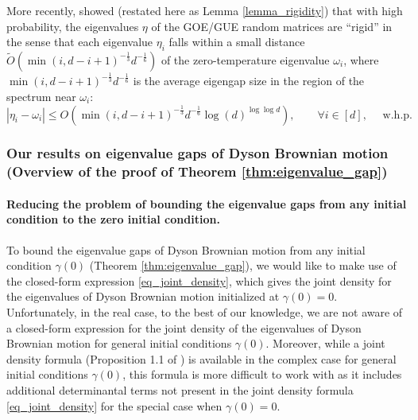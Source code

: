 \documentclass[11pt,letterpaper]{article}
\begin{document}
More recently, \cite{erdHos2012rigidity} showed (restated here as Lemma \ref{lemma_rigidity}) that with high probability, the eigenvalues $\eta$ of the GOE/GUE random matrices are ``rigid'' in the sense that each eigenvalue $\eta_i$ falls within a small distance $\tilde{O}(\min(i, d-i+1)^{-\frac{1}{3}} d^{-\frac{1}{6}})$ of the zero-temperature eigenvalue $\omega_i$, where $\min(i, d-i+1)^{-\frac{1}{3}} d^{-\frac{1}{6}}$ is the average eigengap size in the region of the spectrum
  near $\omega_i$:
%
\begin{equation}\label{eq_ridgidity}
 |\eta_i - \omega_i| \leq O( \min(i, d-i+1)^{-\frac{1}{3}} d^{-\frac{1}{6}} \log(d)^{\log \log d}), \qquad \forall i \in [d], \quad \textrm{ w.h.p.}
\end{equation}


%
\subsubsection{Our results on eigenvalue gaps of Dyson Brownian motion (Overview of the proof of Theorem \ref{thm:eigenvalue_gap})} \label{overview_eigenvalue_gaps}

\paragraph{Reducing the problem of bounding the eigenvalue gaps from any initial condition to the zero initial condition.}

%
To bound the eigenvalue gaps of Dyson Brownian motion from any initial condition $\gamma(0)$ (Theorem \ref{thm:eigenvalue_gap}), we would like to make use of the closed-form expression \eqref{eq_joint_density}, which gives the joint density for the eigenvalues of Dyson Brownian motion initialized at $\gamma(0)=0$.
%
Unfortunately, in the real case, to the best of our knowledge, we are not aware of a closed-form expression for the joint density of the eigenvalues of Dyson Brownian motion for general initial conditions $\gamma(0)$.  
%
Moreover, while a joint density formula (Proposition 1.1 of \cite{johansson2001universality}) is available in the complex case for general initial conditions $\gamma(0)$, this formula is more difficult to work with as it includes additional determinantal terms not present in the joint density formula \eqref{eq_joint_density}  for the special case when $\gamma(0) = 0$.
\end{document}

